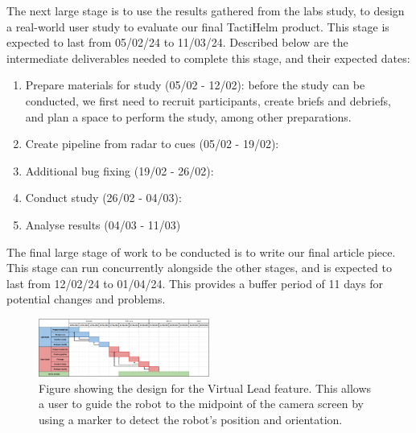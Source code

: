 \documentclass{interim}
\begin{document}
The next large stage is to use the results gathered from the labs study, to design a real-world user study to evaluate our final TactiHelm product. This stage is expected to last from 05/02/24 to 11/03/24. Described below are the intermediate deliverables needed to complete this stage, and their expected dates: 
\begin{enumerate}[label=2.\arabic*]
    \item Prepare materials for study (05/02 - 12/02): before the study can be conducted, we first need to recruit participants, create briefs and debriefs, and plan a space to perform the study, among other preparations.
    \item Create pipeline from radar to cues (05/02 - 19/02):
    \item Additional bug fixing (19/02 - 26/02):
    \item Conduct study (26/02 - 04/03):
    \item Analyse results (04/03 - 11/03)
\end{enumerate}

The final large stage of work to be conducted is to write our final article piece. This stage can run concurrently alongside the other stages, and is expected to last from 12/02/24 to 01/04/24. This provides a buffer period of 11 days for potential changes and problems.

\begin{figure}[!ht]
    \centering
    \includegraphics[width=0.50\textwidth]{images/work-plan.pdf}
    \caption{Figure showing the design for the Virtual Lead feature. This allows a user to guide the robot to the midpoint of the camera screen by using a marker to detect the robot's position and orientation.}
    \label{fig:virtual-lead-design}
\end{figure}




\end{document}
